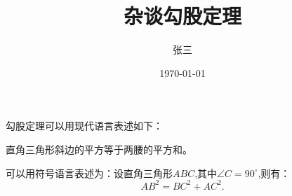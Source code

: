 \documentclass{ctexart} %
\title{\heiti 杂谈勾股定理}
\author{\kaishu 张三}
\date{\today}
\newcommand\degree{^\circ} %
\begin{document}

	\maketitle
	 勾股定理可以用现代语言表述如下：
	 
	 直角三角形斜边的平方等于两腰的平方和。
	 
	 可以用符号语言表述为：设直角三角形$ABC$,其中$\angle C=90\degree$,则有：
	 \begin{equation}
	 AB^2 = BC^2+AC^2.
	 \end{equation}
\end{document}
